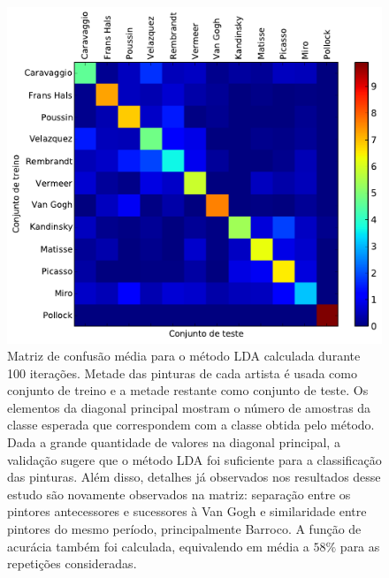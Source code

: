 \begin{figure}[h!]
\begin{center}
      \caption{Matriz de confusão média para o método LDA calculada
        durante 100 iterações. Metade das pinturas de cada artista é
        usada como conjunto de treino e a metade restante como
        conjunto de teste. Os elementos da diagonal principal mostram
        o número de amostras da classe esperada que correspondem com a
        classe obtida pelo método. Dada a grande quantidade de valores
        na diagonal principal, a validação sugere que o método LDA foi
        suficiente para a classificação das pinturas. Além disso,
        detalhes já observados nos resultados desse estudo são
        novamente observados na matriz: separação entre os pintores
        antecessores e sucessores à Van Gogh e similaridade entre
        pintores do mesmo período, principalmente Barroco. A função de
        acurácia também foi calculada, equivalendo em média a $58\%$
        para as repetições
        consideradas.}  \label{fig:cm} 
     \includegraphics[width=\columnwidth]{figs/matriz_confusao} \fonteminha
\end{center}
\end{figure}


